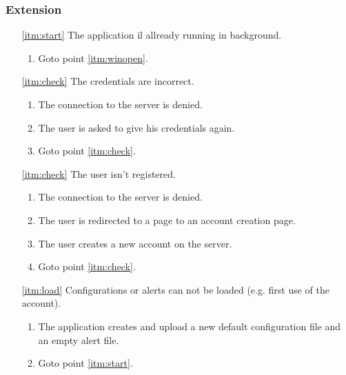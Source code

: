 \subsubsection{Extension}
\begin{enumerate}
	\item[\ref{itm:start}] The application il allready running in background.
	\begin{enumerate}[i]
		\item Goto point \ref{itm:winopen}.
	\end{enumerate}
	
	\item[\ref{itm:check}] The credentials are incorrect.
	\begin{enumerate}[i]
		\item The connection to the server is denied.
		\item The user is asked to give his credentials again.
		\item Goto point \ref{itm:check}.
	\end{enumerate}
	
		\item[\ref{itm:check}] The user isn't registered.
	\begin{enumerate}[i]
		\item The connection to the server is denied.
		\item The user is redirected to a page to an account creation page.
		\item The user creates a new account on the server.
		\item Goto point \ref{itm:check}.
	\end{enumerate}
	
	\item[\ref{itm:load}] Configurations or alerts can not be loaded (e.g. first use of the account).
	\begin{enumerate}[i]
		\item The application creates and upload a new default configuration file and an empty alert file.
		\item Goto point \ref{itm:start}.
	\end{enumerate}
\end{enumerate}